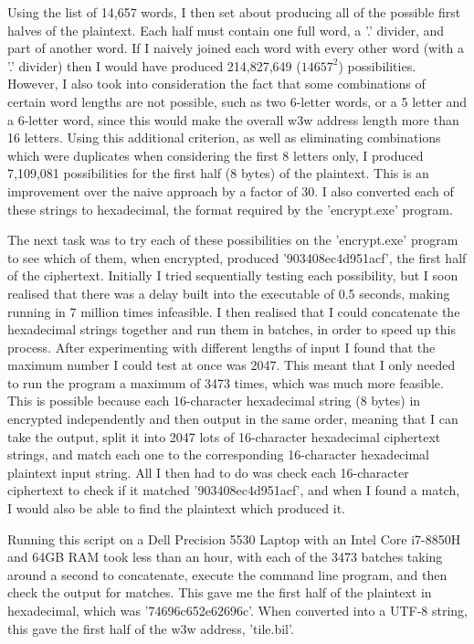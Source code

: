 \documentclass[a4paper, 11pt]{article}
\begin{document}
Using the list of 14,657 words, I then set about producing all of the possible first halves of the plaintext. 
Each half must contain one full word, a '.' divider, and part of another word. 
If I naively joined each word with every other word (with a '.' divider) then I would have produced 214,827,649 ($14657^2$) possibilities. 
However, I also took into consideration the fact that some combinations of certain word lengths are not possible, 
such as two 6-letter words, or a 5 letter and a 6-letter word, since this would make the overall w3w address length more than 16 letters. 
Using this additional criterion, as well as eliminating combinations which were duplicates when considering the first 8 letters only, 
I produced 7,109,081 possibilities for the first half (8 bytes) of the plaintext. 
This is an improvement over the naive approach by a factor of 30. 
I also converted each of these strings to hexadecimal, the format required by the 'encrypt.exe' program. 

The next task was to try each of these possibilities on the 'encrypt.exe' program to see which of them, when encrypted, 
produced '903408ec4d951acf', the first half of the ciphertext. 
Initially I tried sequentially testing each possibility, but I soon realised that there was a delay built into the executable of 0.5 seconds, 
making running in 7 million times infeasible. 
I then realised that I could concatenate the hexadecimal strings together and run them in batches, in order to speed up this process. 
After experimenting with different lengths of input I found that the maximum number I could test at once was 2047. 
This meant that I only needed to run the program a maximum of 3473 times, which was much more feasible. 
This is possible because each 16-character hexadecimal string (8 bytes) in encrypted independently and then output in the same order, 
meaning that I can take the output, split it into 2047 lots of 16-character hexadecimal ciphertext strings, 
and match each one to the corresponding 16-character hexadecimal plaintext input string. 
All I then had to do was check each 16-character ciphertext to check if it matched '903408ec4d951acf', 
and when I found a match, I would also be able to find the plaintext which produced it. 

Running this script on a Dell Precision 5530 Laptop with an Intel Core i7-8850H and 64GB RAM took less than an hour, 
with each of the 3473 batches taking around a second to concatenate, execute the command line program, and then check the output for matches. 
This gave me the first half of the plaintext in hexadecimal, which was '74696c652e62696c'. 
When converted into a UTF-8 string, this gave the first half of the w3w address, 'tile.bil'. 
\end{document}
